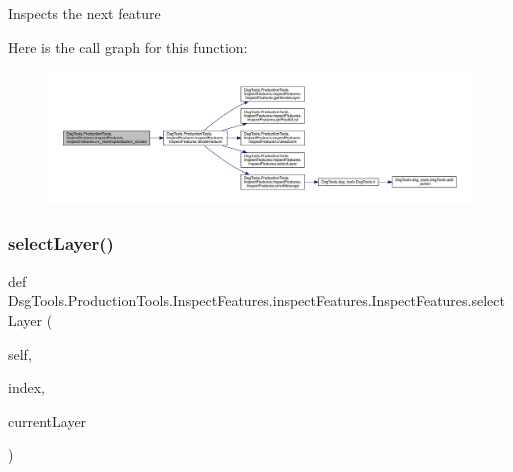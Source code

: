 \begin{DoxyVerb}Inspects the next feature
\end{DoxyVerb}
 Here is the call graph for this function\+:
\nopagebreak
\begin{figure}[H]
\begin{center}
\leavevmode
\includegraphics[width=350pt]{class_dsg_tools_1_1_production_tools_1_1_inspect_features_1_1inspect_features_1_1_inspect_features_ad96ff70d42b8067fc3edadd1e92127b0_cgraph}
\end{center}
\end{figure}
\mbox{\label{class_dsg_tools_1_1_production_tools_1_1_inspect_features_1_1inspect_features_1_1_inspect_features_ac4a9bc09918ae38f532a5c99495040af}} 
\subsubsection{\texorpdfstring{select\+Layer()}{selectLayer()}}
{\footnotesize\ttfamily def Dsg\+Tools.\+Production\+Tools.\+Inspect\+Features.\+inspect\+Features.\+Inspect\+Features.\+select\+Layer (\begin{DoxyParamCaption}\item[{}]{self,  }\item[{}]{index,  }\item[{}]{current\+Layer }\end{DoxyParamCaption})}

